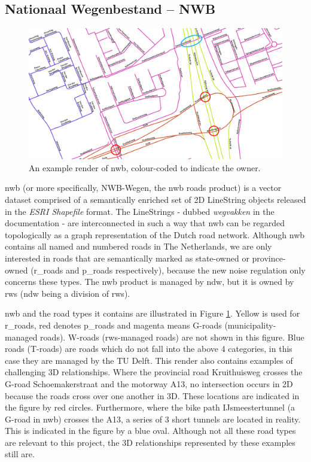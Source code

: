 \subsection{Nationaal Wegenbestand – NWB}
\label{sub:nwb}

\begin{figure}
    \centering
    \includegraphics[width=\linewidth]{final_report/figs/nwb_sample_02.png} 
    \caption{An example render of \ac{nwb}, colour-coded to indicate the owner.}
    \label{fig:nwb}
\end{figure}

\ac{nwb} (or more specifically, NWB-Wegen, the \ac{nwb} roads product) is a vector dataset comprised of a semantically enriched set of 2D LineString objects released in the \textit{ESRI Shapefile} format. The LineStrings - dubbed \textit{wegvakken} in the documentation - are interconnected in such a way that \ac{nwb} can be regarded topologically as a graph representation of the Dutch road network. Although \ac{nwb} contains all named and numbered roads in The Netherlands, we are only interested in roads that are semantically marked as state-owned or province-owned (\ac{r_roads} and \ac{p_roads} respectively), because the new noise regulation only concerns these types. The \ac{nwb} product is managed by \ac{ndw}, but it is owned by \ac{rws} (\ac{ndw} being a division of \ac{rws}).

\ac{nwb} and the road types it contains are illustrated in Figure \ref{fig:nwb}. Yellow is used for \ac{r_roads}, red denotes \ac{p_roads} and magenta means G-roads (municipality-managed roads). W-roads (\ac{rws}-managed roads) are not shown in this figure. Blue roads (T-roads) are roads which do not fall into the above 4 categories, in this case they are managed by the TU Delft. This render also contains examples of challenging 3D relationships. Where the provincial road Kruithuisweg crosses the G-road Schoemakerstraat and the motorway A13, no intersection occurs in 2D because the roads cross over one another in 3D. These locations are indicated in the figure by red circles. Furthermore, where the bike path IJsmeestertunnel (a G-road in \ac{nwb}) crosses the A13, a series of 3 short tunnels are located in reality. This is indicated in the figure by a blue oval. Although not all these road types are relevant to this project, the 3D relationships represented by these examples still are.

